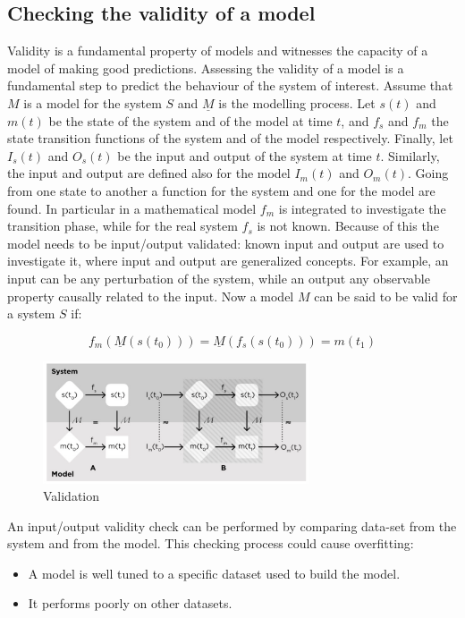   \subsection{Checking the validity of a model}
  Validity is a fundamental property of models and witnesses the capacity of a model of making good predictions.
  Assessing the validity of a model is a fundamental step to predict the behaviour of the system of interest.
  Assume that $M$ is a model for the system $S$ and $\underline{M}$ is the modelling process.
  Let $s(t)$ and $m(t)$ be the state of the system and of the model at time $t$, and $f_s$ and $f_m$ the state transition functions of the system and of the model respectively.
  Finally, let $I_s(t)$ and $O_s(t)$ be the input and output of the system at time $t$.
  Similarly, the input and output are defined also for the model $I_m(t)$ and $O_m(t)$.
  Going from one state to another a function for the system and one for the model are found.
  In particular in a mathematical model $f_m$ is integrated to investigate the transition phase, while for the real system $f_s$ is not known.
  Because of this the model needs to be input/output validated: known input and output are used to investigate it, where input and output are generalized concepts.
  For example, an input can be any perturbation of the system, while an output any observable property causally related to the input.
  Now a model $M$ can be said to be valid for a system $S$ if:

  $$f_m(\underline{M}(s(t_0))) = \underline{M}(f_s(s(t_0))) = m(t_1)$$

  \begin{figure}[H]
    \centering
    \includegraphics[width=0.7\textwidth]{validation.png}
    \caption{Validation}
    \end{figure}
  \noindent

  An input/output validity check can be performed by comparing data-set from the system and from the model.
  This checking process could cause overfitting:

  \begin{multicols}{2}
    \begin{itemize}
      \item A model is well tuned to a specific dataset used to build the model.
      \item It performs poorly on other datasets.
    \end{itemize}
  \end{multicols}

